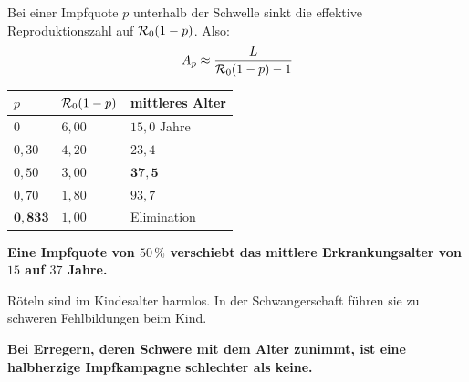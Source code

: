 \begin{warnung}
Bei einer Impfquote $p$ unterhalb der Schwelle sinkt die effektive Reproduktionszahl auf $\mathcal{R}_0(1-p)$. Also:
\[ A_p \approx \frac{L}{\mathcal{R}_0(1-p) - 1} \]

\begin{center}
{\small
\renewcommand{\arraystretch}{1.48}
\begin{tabular}{@{}P{1.6cm}P{2.0cm}P{2.6cm}@{}}
\toprule
$p$ & $\mathcal{R}_0(1-p)$ & \textbf{mittleres Alter}\\
\midrule
$0$ & $6{,}00$ & $15{,}0$ Jahre\\
$0{,}30$ & $4{,}20$ & $23{,}4$\\
$0{,}50$ & $3{,}00$ & \textcolor{akzent}{$\mathbf{37{,}5}$}\\
$0{,}70$ & $1{,}80$ & $93{,}7$\\
$\mathbf{0{,}833}$ & $1{,}00$ & \textcolor{gruen}{Elimination}\\
\bottomrule
\end{tabular}}
\end{center}

\begin{center}
\begin{minipage}{0.9\textwidth}
\textbf{Eine Impfquote von $50\,\%$ verschiebt das mittlere Erkrankungsalter von $15$ auf $37$ Jahre.}
\end{minipage}
\end{center}

Röteln sind im Kindesalter harmlos. In der Schwangerschaft führen sie zu schweren Fehlbildungen beim Kind.

\begin{center}
\begin{minipage}{0.88\textwidth}
\end{minipage}
\end{center}

\begin{center}
\begin{minipage}{0.9\textwidth}
\textbf{Bei Erregern, deren Schwere mit dem Alter zunimmt, ist eine halbherzige Impfkampagne schlechter als keine.}
\end{minipage}
\end{center}


\end{warnung}
